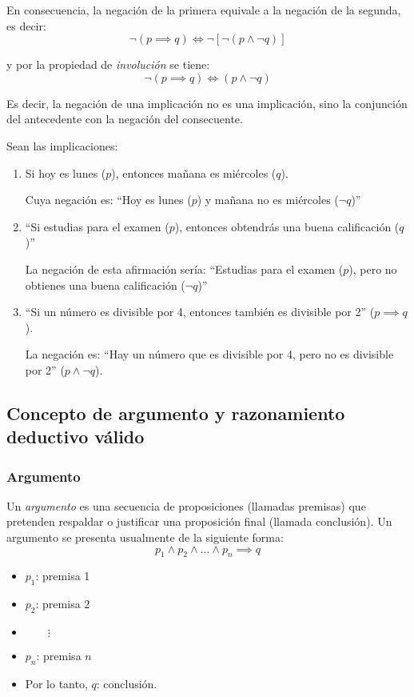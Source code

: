 En consecuencia, la negación de la primera equivale a la negación de la segunda, es decir:
\[ \neg (p \implies q) \iff \neg [ \neg (p \land \neg q)] \]

y por la propiedad de \textit{involución} se tiene:
\[ \neg (p \implies q) \iff (p \land \neg q) \]

Es decir, la negación de una implicación no es una implicación, sino la conjunción del antecedente con la negación del consecuente.

\begin{fmd-example}
	Sean las implicaciones:
	
	\begin{enumerate}[label=\roman*)]
		\item Si hoy es lunes ($p$), entonces mañana es miércoles ($q$).
		
		Cuya negación es: ``Hoy es lunes ($p$) y mañana no es miércoles ($\neg q$)''
		
		\item ``Si estudias para el examen ($p$), entonces obtendrás una buena calificación ($q$)''
		
		La negación de esta afirmación sería: ``Estudias para el examen ($p$), pero no obtienes una buena calificación ($\neg q$)''
		
		\item ``Si un número es divisible por 4, entonces también es divisible por 2'' ($p \implies q$).
		
		La negación es: ``Hay un número que es divisible por 4, pero no es divisible por 2'' ($ p \land \neg q$).
	\end{enumerate}
\end{fmd-example}

\subsection{Concepto de argumento y razonamiento deductivo válido}

\subsubsection{Argumento}
\begin{fmd-definition}[Argumento]
	Un \textit{argumento} es una secuencia de proposiciones (llamadas premisas) que pretenden respaldar o justificar una proposición final (llamada conclusión). Un argumento se presenta usualmente de la siguiente forma:
	\[ p_1 \land p_2 \land \dots \land p_n \implies q \]
	
	\begin{itemize}[itemsep=-3pt]
		\item $p_1$: premisa 1
		\item $p_2$: premisa 2
		\item $\qquad \vdots$
		\item $p_n$: premisa $n$
		\item Por lo tanto, $q$: conclusión.
	\end{itemize}
\end{fmd-definition}

